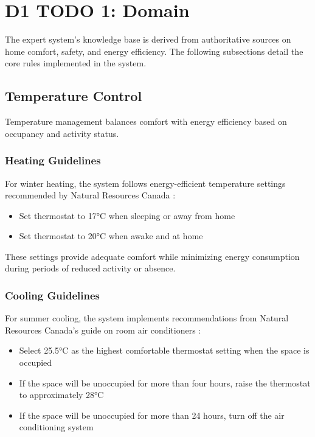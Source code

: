 \documentclass{article}
\begin{document}
\section{D1 TODO 1: Domain}

The expert system's knowledge base is derived from authoritative sources on home comfort, safety, and energy efficiency. The following subsections detail the core rules implemented in the system.

\subsection{Temperature Control}

Temperature management balances comfort with energy efficiency based on occupancy and activity status.

\subsubsection{Heating Guidelines}

For winter heating, the system follows energy-efficient temperature settings recommended by Natural Resources Canada \cite{nrcan_winter_heating}:

\begin{itemize}
    \item Set thermostat to 17°C when sleeping or away from home
    \item Set thermostat to 20°C when awake and at home
\end{itemize}

These settings provide adequate comfort while minimizing energy consumption during periods of reduced activity or absence.

\subsubsection{Cooling Guidelines}

For summer cooling, the system implements recommendations from Natural Resources Canada's guide on room air conditioners \cite{nrcan_cooling}:

\begin{itemize}
    \item Select 25.5°C as the highest comfortable thermostat setting when the space is occupied
    \item If the space will be unoccupied for more than four hours, raise the thermostat to approximately 28°C
    \item If the space will be unoccupied for more than 24 hours, turn off the air conditioning system
\end{itemize}
\end{document}
